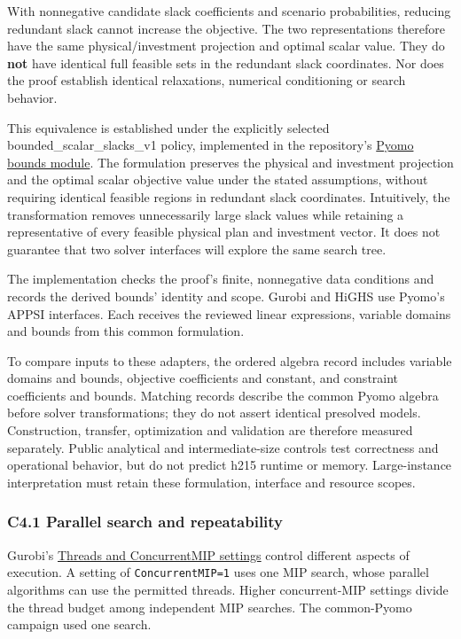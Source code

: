 \documentclass[
  english,
  11pt,
  a4paper,
]{article}
\begin{document}
With nonnegative candidate slack coefficients and scenario
probabilities, reducing redundant slack cannot increase the objective.
The two representations therefore have the same physical/investment
projection and optimal scalar value. They do \textbf{not} have identical
full feasible sets in the redundant slack coordinates. Nor does the
proof establish identical relaxations, numerical conditioning or search
behavior.

This equivalence is established under the explicitly selected bounded\_scalar\_slacks\_v1 policy, implemented in the repository's \href{https://github.com/unb-lamfo-or-ai-hpc/model-agrologistic/blob/main/src/logic/pyomo_bounds.py}{Pyomo bounds module}. The formulation preserves the physical and investment projection and the optimal scalar objective value under the stated assumptions, without requiring identical feasible regions in redundant slack coordinates.
Intuitively, the transformation removes unnecessarily large slack values while retaining a representative of every feasible physical plan and investment vector.
It does not guarantee that two solver interfaces will explore the same search tree.

The implementation checks the proof's finite, nonnegative data conditions and records the derived bounds' identity and scope. Gurobi and HiGHS use Pyomo's APPSI interfaces. Each receives the reviewed linear expressions, variable domains and bounds from this common formulation.

To compare inputs to these adapters, the ordered algebra record includes
variable domains and bounds, objective coefficients and constant, and
constraint coefficients and bounds. Matching records describe the common
Pyomo algebra before solver transformations; they do not assert
identical presolved models. Construction, transfer, optimization and
validation are therefore measured separately. Public analytical and
intermediate-size controls test correctness and operational behavior,
but do not predict h215 runtime or memory. Large-instance interpretation
must retain these formulation, interface and resource scopes.

\subsubsection{C4.1 Parallel search and
repeatability}\label{c4.1-parallel-search-and-repeatability}

Gurobi's
\href{https://docs.gurobi.com/projects/optimizer/en/current/reference/parameters.html\#concurrentmip}{Threads
and ConcurrentMIP settings} control different aspects of execution. A
setting of \texttt{ConcurrentMIP=1} uses one MIP search, whose parallel
algorithms can use the permitted threads. Higher concurrent-MIP settings
divide the thread budget among independent MIP searches. The
common-Pyomo campaign used one search.
\end{document}
